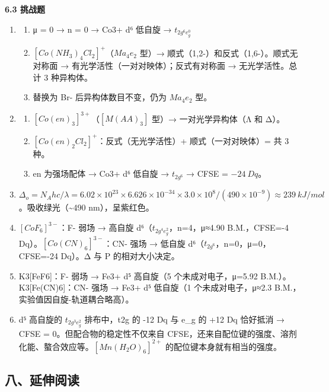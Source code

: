 \documentclass[a4paper,11pt]{ctexart}
\providecommand{\tightlist}{\setlength{\itemsep}{0pt}\setlength{\parskip}{0pt}}
\begin{document}
\textbf{6.3 挑战题}

\begin{enumerate}
\def\labelenumi{\arabic{enumi}.}
\setcounter{enumi}{9}
\item
  \begin{enumerate}
  \def\labelenumii{(\arabic{enumii})}
  \tightlist
  \item
    μ = 0 → n = 0 → Co3+ d⁶ 低自旋 → \(t_{2g^6 e_g^0}\)
  \item
    \([Co(NH_3)_4Cl_2]^+\)（\(Ma_4e_2\) 型）→ 顺式（1,2-）和反式（1,6-）。顺式无对称面 → 有光学活性（一对对映体）；反式有对称面 → 无光学活性。总计 3 种异构体。
  \item
    替换为 Br- 后异构体数目不变，仍为 \(Ma_4e_2\) 型。
  \end{enumerate}
\item
  \begin{enumerate}
  \def\labelenumii{(\arabic{enumii})}
  \tightlist
  \item
    \([Co(en)_3]^{3+}\)（\([M(AA)_3]\) 型）→ 一对光学异构体（Λ 和 Δ）。
  \item
    \([Co(en)_2Cl_2]^+\)：反式（无光学活性）+ 顺式（一对对映体）= 共 3 种。
  \item
    en 为强场配体 → Co3+ d⁶ 低自旋 → \(t_{2g^6}\) → CFSE = \(-24\ Dq\)。
  \end{enumerate}
\item
  \(\Delta_o = N_A hc/\lambda = 6.02\times10^{23} \times 6.626\times10^{-34} \times 3.0\times10^8 / (490\times10^{-9}) \approx 239\ kJ/mol\)。吸收绿光（\textasciitilde490 nm），呈紫红色。
\item
  \([CoF_6]^{3-}\)：F- 弱场 → 高自旋 d⁶（\(t_{2g^4 e_g^2}\)，n=4，μ≈4.90 B.M.，CFSE=-4 Dq）。\([Co(CN)_6]^{3-}\)：CN- 强场 → 低自旋 d⁶（\(t_{2g^6}\)，n=0，μ=0，CFSE=-24 Dq）。Δ 与 P 的相对大小决定。
\item
  K3{[}FeF6{]}：F- 弱场 → Fe3+ d⁵ 高自旋（5 个未成对电子，μ=5.92 B.M.）。K3{[}Fe(CN)6{]}：CN- 强场 → Fe3+ d⁵ 低自旋（1 个未成对电子，μ≈2.3 B.M.，实验值因自旋-轨道耦合略高）。
\item
  d⁵ 高自旋的 \(t_{2g^3 e_g^2}\) 排布中，t2g 的 -12 Dq 与 e\_g 的 +12 Dq 恰好抵消 → CFSE = 0。但配合物的稳定性不仅来自 CFSE，还来自配位键的强度、溶剂化能、螯合效应等。\([Mn(H_2O)_6]^{2+}\) 的配位键本身就有相当的强度。
\end{enumerate}

\subsection{八、延伸阅读}\label{ux516bux5ef6ux4f38ux9605ux8bfb}
\end{document}
